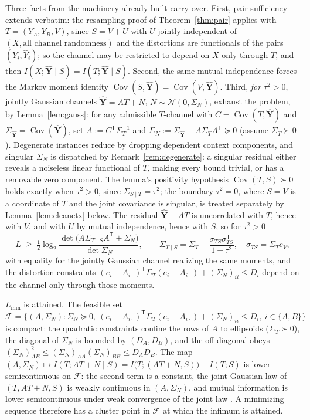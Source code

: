 ﻿\documentclass[11pt,onecolumn]{IEEEtran}
\newcommand{\Cov}{\operatorname{Cov}}
\newcommand{\hY}{\widehat{Y}}
\begin{document}
Three facts from the machinery already built carry over. First, pair
sufficiency extends verbatim: the resampling proof of
Theorem~\ref{thm:pair} applies with $T=(Y_A,Y_B,V)$, since $S=V+U$ with
$U$ jointly independent of $(X,\text{all channel randomness})$ and the
distortions are functionals of the pairs $(Y_i,\hY_i)$; so the channel may
be restricted to depend on $X$ only through $T$, and then
$I(X;\hat{\mathbf Y}\mid S)=I(T;\hat{\mathbf Y}\mid S)$. Second, the same
mutual independence forces the Markov moment identity
$\Cov(S,\hat{\mathbf Y})=\Cov(V,\hat{\mathbf Y})$. Third, \emph{for
$\tau^2>0$}, jointly Gaussian
channels $\hat{\mathbf Y}=AT+N$, $N\sim\mathcal N(0,\Sigma_N)$, exhaust
the problem, by Lemma~\ref{lem:gauss}: for any admissible $T$-channel
with $C=\Cov(T,\hat{\mathbf Y})$ and
$\Sigma_{\hat{\mathbf Y}}=\Cov(\hat{\mathbf Y})$, set
$A:=C^{\mathsf T}\Sigma_T^{-1}$ and
$\Sigma_N:=\Sigma_{\hat{\mathbf Y}}-A\Sigma_TA^{\mathsf T}\succeq0$ (assume
$\Sigma_T\succ0$). Degenerate instances reduce by dropping dependent
context components, and singular $\Sigma_N$ is dispatched by
Remark~\ref{rem:degenerate}: a singular residual either reveals
a noiseless linear functional of $T$, making every bound trivial, or
has a removable zero component. The lemma's positivity hypothesis
$\Cov(T,S)\succ0$ holds exactly when $\tau^2>0$, since
$\Sigma_{S\mid T}=\tau^2$; the boundary $\tau^2=0$, where $S=V$ is a
coordinate of $T$ and the joint covariance is singular, is treated
separately by Lemma~\ref{lem:cleanctx} below. The residual
$\hat{\mathbf Y}-AT$ is
uncorrelated with $T$, hence with $V$, and with $U$ by mutual
independence, hence with $S$, so for $\tau^2>0$
\begin{equation}
 L\;\ge\;\tfrac12\log_2
 \frac{\det\bigl(A\Sigma_{T\mid S}A^{\mathsf T}+\Sigma_N\bigr)}
 {\det\Sigma_N},
 \qquad
 \Sigma_{T\mid S}
 =\Sigma_T-\frac{\sigma_{TS}\sigma_{TS}^{\mathsf T}}{1+\tau^2},
 \quad \sigma_{TS}=\Sigma_Te_V,
 \label{eq:gauss-exhaust}
\end{equation}
with equality for the jointly Gaussian channel realizing the same moments,
and the distortion constraints
$(e_i-A_{i\cdot})^{\mathsf T}\Sigma_T(e_i-A_{i\cdot})+(\Sigma_N)_{ii}\le D_i$
depend on the channel only through those moments.

$L_{\min}$ is attained. The feasible set
\[
\mathcal F=\bigl\{(A,\Sigma_N):\Sigma_N\succeq0,\
(e_i-A_{i\cdot})^{\mathsf T}\Sigma_T(e_i-A_{i\cdot})
+(\Sigma_N)_{ii}\le D_i,\ i\in\{A,B\}\bigr\}
\]
is compact: the quadratic constraints confine the rows of $A$ to
ellipsoids ($\Sigma_T\succ0$), the diagonal of $\Sigma_N$ is bounded by
$(D_A,D_B)$, and the off-diagonal obeys
$(\Sigma_N)_{AB}^2\le(\Sigma_N)_{AA}(\Sigma_N)_{BB}\le D_AD_B$. The map
$(A,\Sigma_N)\mapsto I(T;AT+N\mid S)=I\bigl(T;(AT+N,S)\bigr)-I(T;S)$ is
lower semicontinuous on $\mathcal F$: the second term is a constant, the
joint Gaussian law of $(T,AT+N,S)$ is weakly continuous in
$(A,\Sigma_N)$, and mutual information is lower semicontinuous under
weak convergence of the joint law \cite{posner1975}. A minimizing
sequence therefore has a cluster point in $\mathcal F$ at which the
infimum is attained.
\end{document}
